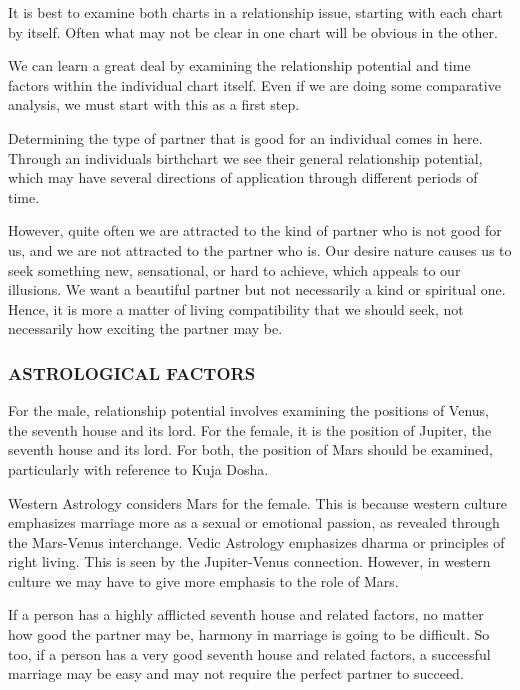 It is best to examine both charts in a relationship issue, starting with each chart by itself. Often what may not be clear in one chart will be obvious in the other.

 

We can learn a great deal by examining the relationship potential and time factors within the individual chart itself. Even if we are doing some comparative analysis, we must start with this as a first step.

 

Determining the type of partner that is good for an individual comes in here. Through an individuals birthchart we see their general relationship potential, which may have several directions of application through different periods of time.

 

However, quite often we are attracted to the kind of partner who is not good for us, and we are not attracted to the partner who is. Our desire nature causes us to seek something new, sensational, or hard to achieve, which appeals to our illusions. We want a beautiful partner but not necessarily a kind or spiritual one. Hence, it is more a matter of living compatibility that we should seek, not necessarily how exciting the partner may be.

 

\subsubsection{ASTROLOGICAL FACTORS}

 

For the male, relationship potential involves examining the positions of Venus, the seventh house and its lord. For the female, it is the position of Jupiter, the seventh house and its lord. For both, the position of Mars should be examined, particularly with reference to Kuja Dosha.

 

Western Astrology considers Mars for the female. This is because western culture emphasizes marriage more as a sexual or emotional passion, as revealed through the Mars-Venus interchange. Vedic Astrology emphasizes dharma or principles of right living. This is seen by the Jupiter-Venus connection. However, in western culture we may have to give more emphasis to the role of Mars.

 

If a person has a highly afflicted seventh house and related factors, no matter how good the partner may be, harmony in marriage is going to be difficult.
So too, if a person has a very good seventh house and related factors, a successful marriage may be easy and may not require the perfect partner to succeed.
 

